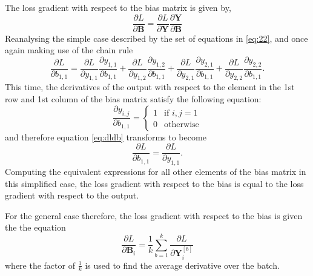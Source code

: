 \documentclass[twocolumn,pra,floatfix]{revtex4-2}
\begin{document}
                The loss gradient with respect to the bias matrix is given by,
                \begin{equation}
                    \frac{\partial L}{\partial \mathbf{B}} = \frac{\partial L}{\partial \mathbf{Y}} \frac{\partial \mathbf{Y}}{\partial \mathbf{B}}\label{eq: loss (conv) wrt bias}
                \end{equation}
                Reanalysing the simple case described by the set of equations in \ref{eq:22}, and once again making use of the chain rule
                \begin{equation}
                    \frac{\partial L}{\partial b_{1,1}} = \frac{\partial L}{\partial y_{1,1}} \frac{\partial y_{1,1}}{\partial b_{1,1}} + \frac{\partial L}{\partial y_{1,2}} \frac{\partial y_{1,2}}{\partial b_{1,1}} + \frac{\partial L}{\partial y_{2,1}} \frac{\partial y_{2,1}}{\partial b_{1,1}} + \frac{\partial L}{\partial y_{2,2}} \frac{\partial y_{2,2}}{\partial b_{1,1}}.\label{eq:dldb}
                \end{equation}
                This time, the derivatives of the output with respect to the element in the 1st row and 1st column of the bias matrix satisfy the following equation:
                \begin{equation}
                    \frac{\partial y_{i,j}}{\partial b_{1,1}} = 
                    \begin{cases}
                        1 & \text{if } i, j = 1 \\
                        0 & \text{otherwise}
                    \end{cases}
                \end{equation}
                and therefore equation \ref{eq:dldb} transforms to become
                \begin{equation}
                    \frac{\partial L}{\partial b_{1,1}} = \frac{\partial L}{\partial y_{1,1}}.
                \end{equation}
                Computing the equivalent expressions for all other elements of the bias matrix in this simplified case, the loss gradient with respect to the bias is equal to the loss gradient with respect to the output.

                For the general case therefore, the loss gradient with respect to the bias is given the the equation
                \begin{equation}
                    \frac{\partial L}{\partial \mathbf{B}_i} = \frac{1}{k}\sum_{b=1}^{k} \frac{\partial L}{\partial \mathbf{Y}^{[b]}_i}
                \end{equation}
                where the factor of $\frac{1}{k}$ is used to find the average derivative over the batch.
\end{document}
